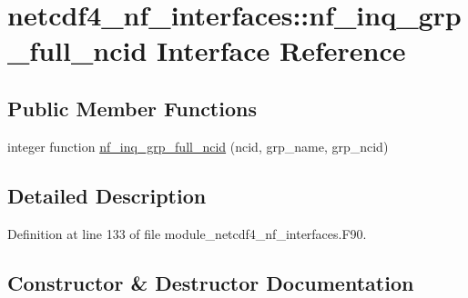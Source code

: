 \hypertarget{interfacenetcdf4__nf__interfaces_1_1nf__inq__grp__full__ncid}{}\section{netcdf4\+\_\+nf\+\_\+interfaces\+:\+:nf\+\_\+inq\+\_\+grp\+\_\+full\+\_\+ncid Interface Reference}
\label{interfacenetcdf4__nf__interfaces_1_1nf__inq__grp__full__ncid}
\subsection*{Public Member Functions}
\begin{DoxyCompactItemize}
\item 
integer function \hyperlink{interfacenetcdf4__nf__interfaces_1_1nf__inq__grp__full__ncid_a99069be6bf70f6bc53c570ed86c4da87}{nf\+\_\+inq\+\_\+grp\+\_\+full\+\_\+ncid} (ncid, grp\+\_\+name, grp\+\_\+ncid)
\end{DoxyCompactItemize}


\subsection{Detailed Description}


Definition at line 133 of file module\+\_\+netcdf4\+\_\+nf\+\_\+interfaces.\+F90.



\subsection{Constructor \& Destructor Documentation}
\mbox{\label{interfacenetcdf4__nf__interfaces_1_1nf__inq__grp__full__ncid_a99069be6bf70f6bc53c570ed86c4da87}} 

